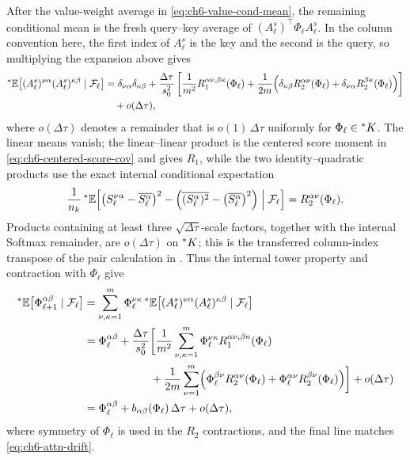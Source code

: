 \begin{proofsketch}
After the value-weight average in \eqref{eq:ch6-value-cond-mean}, the remaining conditional mean is the fresh query--key average of $(A_\ell^s)^\top \Phi_\ell A_\ell^s$. In the column convention here, the first index of $A_\ell^s$ is the key and the second is the query, so multiplying the expansion above gives
\begin{equation}
\label{eq:ch6-attn-pair-mean}
\begin{aligned}
{}^*\mathbb{E}\bigl[(A_\ell^s)^{\nu\alpha} (A_\ell^s)^{\kappa\beta} \mid \mathcal{F}_\ell\bigr]
&= \delta_{\nu\alpha}\delta_{\kappa\beta}
  + \frac{\Delta\tau}{s_0^2}\left[
      \frac{1}{m^2} R_1^{\alpha\nu,\beta\kappa}(\Phi_\ell)
      + \frac{1}{2m}\Bigl(\delta_{\kappa\beta} R_2^{\alpha\nu}(\Phi_\ell) + \delta_{\nu\alpha} R_2^{\beta\kappa}(\Phi_\ell)\Bigr)
    \right] \\
&\quad + o(\Delta\tau),
\end{aligned}
\end{equation}
where $o(\Delta\tau)$ denotes a remainder that is $o(1)\,\Delta\tau$ uniformly for $\Phi_\ell \in {}^*K$. The linear means vanish; the linear--linear product is the centered score moment in \eqref{eq:ch6-centered-score-cov} and gives $R_1$, while the two identity--quadratic products use the exact internal conditional expectation
\begin{equation}
\label{eq:ch6-R2-moment}
\frac{1}{n_k}\,{}^*\mathbb{E}\!\left[\bigl(S_\ell^{\nu\alpha} - \overline{S_\ell^\alpha}\bigr)^2 - \left(\overline{(S_\ell^\alpha)^2} - \bigl(\overline{S_\ell^\alpha}\bigr)^2\right) \;\middle|\; \mathcal{F}_\ell\right] = R_2^{\alpha\nu}(\Phi_\ell).
\end{equation}
Products containing at least three $\sqrt{\Delta\tau}$-scale factors, together with the internal Softmax remainder, are $o(\Delta\tau)$ on ${}^*K$; this is the transferred column-index transpose of the pair calculation in \cite[Lemmas C.2--C.3]{noci2023shaped}. Thus the internal tower property and contraction with $\Phi_\ell$ give
\begin{equation}
\label{eq:ch6-drift-derivation}
\begin{aligned}
{}^*\mathbb{E}\bigl[\Phi_{\ell+1}^{\alpha\beta} \mid \mathcal{F}_\ell\bigr]
&= \sum_{\nu,\kappa=1}^m \Phi_\ell^{\nu\kappa}\,{}^*\mathbb{E}\bigl[(A_\ell^s)^{\nu\alpha} (A_\ell^s)^{\kappa\beta} \mid \mathcal{F}_\ell\bigr] \\
&= \Phi_\ell^{\alpha\beta}
   + \frac{\Delta\tau}{s_0^2}\biggl[
       \frac{1}{m^2}\sum_{\nu,\kappa=1}^m \Phi_\ell^{\nu\kappa} R_1^{\alpha\nu,\beta\kappa}(\Phi_\ell) \\
&\qquad\qquad\qquad {}+ \frac{1}{2m}\sum_{\nu=1}^m \Bigl(\Phi_\ell^{\beta\nu} R_2^{\alpha\nu}(\Phi_\ell) + \Phi_\ell^{\alpha\nu} R_2^{\beta\nu}(\Phi_\ell)\Bigr)
     \biggr]
   + o(\Delta\tau) \\
&= \Phi_\ell^{\alpha\beta} + b_{\alpha\beta}(\Phi_\ell)\,\Delta\tau + o(\Delta\tau),
\end{aligned}
\end{equation}
where symmetry of $\Phi_\ell$ is used in the $R_2$ contractions, and the final line matches \eqref{eq:ch6-attn-drift}.


\end{proofsketch}
